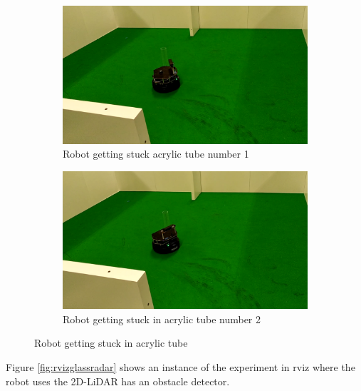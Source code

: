 \begin{figure}[ht!]
  \centering
  \begin{subfigure}[b]{0.49\linewidth}
    \includegraphics[width=\linewidth]{imgs/chapter5/glassLF1.png}
     \caption{Robot getting stuck acrylic tube number 1}
     \label{fig::glassLF1}
  \end{subfigure}
  \begin{subfigure}[b]{0.49\linewidth}
    \includegraphics[width=\linewidth]{imgs/chapter5/glassLF2.png}
    \caption{Robot getting stuck in acrylic tube  number 2}
    \label{fig::glassLF2}
  \end{subfigure}
  \caption{Robot getting stuck in acrylic tube}
  \label{fig:glassLF}
\end{figure}


Figure \ref{fig:rvizglassradar} shows an instance of the experiment in rviz where the robot uses the 2D-\ac{LiDAR} has an obstacle detector.

